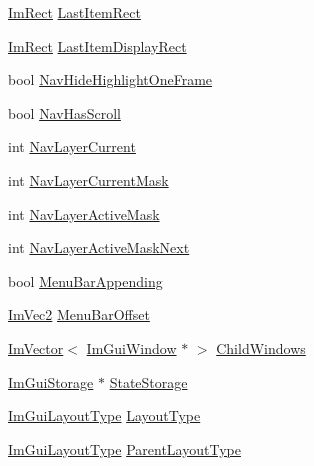 \begin{DoxyCompactItemize}
\item 
\mbox{\hyperlink{struct_im_rect}{Im\+Rect}} \mbox{\hyperlink{struct_im_gui_window_temp_data_abf4f36a114876653296c2eac61825001}{Last\+Item\+Rect}}
\item 
\mbox{\hyperlink{struct_im_rect}{Im\+Rect}} \mbox{\hyperlink{struct_im_gui_window_temp_data_a733bb38819fe839ab53be405b696a965}{Last\+Item\+Display\+Rect}}
\item 
bool \mbox{\hyperlink{struct_im_gui_window_temp_data_a039070c94cf3dc0534257becd8d5bce8}{Nav\+Hide\+Highlight\+One\+Frame}}
\item 
bool \mbox{\hyperlink{struct_im_gui_window_temp_data_a5a506f02b64ed01f845a3d473207c3c6}{Nav\+Has\+Scroll}}
\item 
int \mbox{\hyperlink{struct_im_gui_window_temp_data_a6e69d1a33bfa144b93025d75e22809f2}{Nav\+Layer\+Current}}
\item 
int \mbox{\hyperlink{struct_im_gui_window_temp_data_a1dc6ec2d5b4469514b1e162e81a92afc}{Nav\+Layer\+Current\+Mask}}
\item 
int \mbox{\hyperlink{struct_im_gui_window_temp_data_a32b100040134e8925245a7f0e6d48227}{Nav\+Layer\+Active\+Mask}}
\item 
int \mbox{\hyperlink{struct_im_gui_window_temp_data_abd69899e644f15c35914121386a53d3b}{Nav\+Layer\+Active\+Mask\+Next}}
\item 
bool \mbox{\hyperlink{struct_im_gui_window_temp_data_a9f0df1a4566ded9c6ec2629f29af20c6}{Menu\+Bar\+Appending}}
\item 
\mbox{\hyperlink{struct_im_vec2}{Im\+Vec2}} \mbox{\hyperlink{struct_im_gui_window_temp_data_ad83c8b499933d7c765dc564e2d75c302}{Menu\+Bar\+Offset}}
\item 
\mbox{\hyperlink{class_im_vector}{Im\+Vector}}$<$ \mbox{\hyperlink{struct_im_gui_window}{Im\+Gui\+Window}} $\ast$ $>$ \mbox{\hyperlink{struct_im_gui_window_temp_data_ac5ffaaf397b8501b523aa55aa7d34d3d}{Child\+Windows}}
\item 
\mbox{\hyperlink{struct_im_gui_storage}{Im\+Gui\+Storage}} $\ast$ \mbox{\hyperlink{struct_im_gui_window_temp_data_ae8dad2f03fe834cb6b24cb76efe62c59}{State\+Storage}}
\item 
\mbox{\hyperlink{imgui__internal_8h_a86d7bb2ee8297d38b131d8ea7e6430c6}{Im\+Gui\+Layout\+Type}} \mbox{\hyperlink{struct_im_gui_window_temp_data_a56c2607a6965314ec05a351ac6b68c83}{Layout\+Type}}
\item 
\mbox{\hyperlink{imgui__internal_8h_a86d7bb2ee8297d38b131d8ea7e6430c6}{Im\+Gui\+Layout\+Type}} \mbox{\hyperlink{struct_im_gui_window_temp_data_af5f90b71ddcca637fdfd84827d096a9a}{Parent\+Layout\+Type}}

\end{DoxyCompactItemize}
